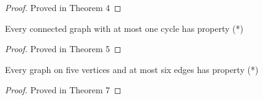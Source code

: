 \begin{proof}
        Proved in \cite{matthias_2022} Theorem 4
\end{proof}

\begin{thm}
\label{thm:4}
    Every connected graph with at most one cycle has property (*)
\end{thm}

\begin{proof}
    Proved in \cite{matthias_2022} Theorem 5
\end{proof}

\begin{thm}
\label{thm:5}
    Every graph on five vertices and at most six edges has property (*)
\end{thm}

\begin{proof}
    Proved in \cite{matthias_2022} Theorem 7
\end{proof}
